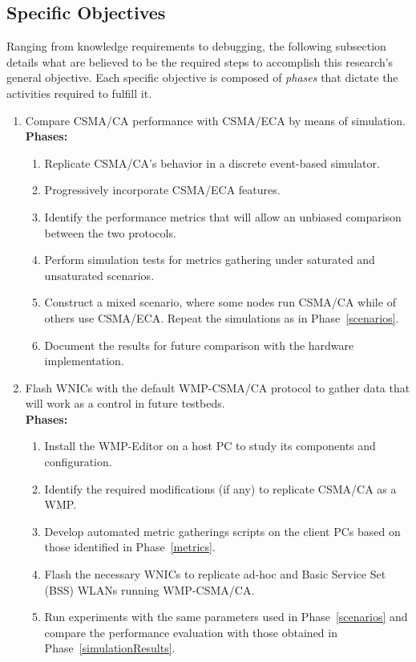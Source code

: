 \subsection{Specific Objectives}
Ranging from knowledge requirements to debugging, the following subsection details what are believed to be the required steps to accomplish this research's general objective. Each specific objective is composed of \emph{phases} that dictate the activities required to fulfill it.
\begin{enumerate}
	\item Compare CSMA/CA performance with CSMA/ECA by means of simulation.\\
	
	{\bfseries Phases:}
	\begin{enumerate}
		\item Replicate CSMA/CA's behavior in a discrete event-based simulator.\label{buildSimulator}
		\item Progressively incorporate CSMA/ECA features.\label{incorporateECA}
		\item Identify the performance metrics that will allow an unbiased comparison between the two protocols.\label{metrics}
		\item Perform simulation tests for metrics gathering under saturated and unsaturated scenarios\label{scenarios}.
		\item Construct a mixed scenario, where some nodes run CSMA/CA while of others use CSMA/ECA. Repeat the simulations as in Phase~\ref{scenarios}.
		\item Document the results for future comparison with the hardware implementation.\label{simulationResults}\\
	\end{enumerate}
	
	\item Flash WNICs with the default WMP-CSMA/CA protocol to gather data that will work as a control in future testbeds.\label{learningWMP}\\
	
	{\bfseries Phases:}
	\begin{enumerate}
		\item Install the WMP-Editor on a host PC to study its components and configuration.
		\item Identify the required modifications (if any) to replicate CSMA/CA as a WMP.
		\item Develop automated metric gatherings scripts on the client PCs based on those identified in Phase~\ref{metrics}.
		\item Flash the necessary WNICs to replicate ad-hoc and Basic Service Set (BSS) WLANs running WMP-CSMA/CA.
		\item Run experiments with the same parameters used in Phase~\ref{scenarios} and compare the performance evaluation with those obtained in Phase~\ref{simulationResults}.\label{WMPExperiment}\\
	\end{enumerate}


\end{enumerate}
